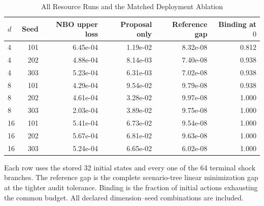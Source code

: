\begin{table}[tbp]
\centering
\caption{All Resource Runs and the Matched Deployment Ablation}
\label{tab:resource_all}
\small
\begin{tabular}{@{}lrrrrr@{}}
\toprule
$d$ & Seed & NBO upper loss & Proposal only & Reference gap & Binding at $0$ \\
\midrule
4 & 101 & 6.45e-04 & 1.19e-02 & 8.32e-08 & 0.812 \\
4 & 202 & 4.88e-04 & 8.14e-03 & 7.40e-08 & 0.938 \\
4 & 303 & 5.23e-04 & 6.31e-03 & 7.02e-08 & 0.938 \\
8 & 101 & 4.29e-04 & 9.54e-02 & 9.79e-08 & 0.938 \\
8 & 202 & 4.61e-04 & 3.28e-02 & 9.97e-08 & 1.000 \\
8 & 303 & 2.03e-04 & 3.89e-02 & 9.75e-08 & 1.000 \\
16 & 101 & 5.41e-04 & 6.73e-02 & 9.54e-08 & 1.000 \\
16 & 202 & 5.67e-04 & 6.81e-02 & 9.63e-08 & 1.000 \\
16 & 303 & 5.24e-04 & 6.65e-02 & 6.02e-08 & 1.000 \\
\bottomrule
\end{tabular}
\par\smallskip\begin{minipage}{\linewidth}\footnotesize Each row uses the stored 32 initial states and every one of the 64 terminal shock branches. The reference gap is the complete scenario-tree linear minimization gap at the tighter audit tolerance. Binding is the fraction of initial actions exhausting the common budget. All declared dimension--seed combinations are included.\end{minipage}
\end{table}
